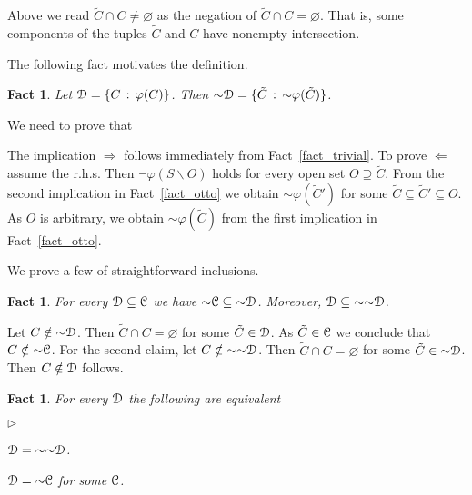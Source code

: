 \documentclass{amsproc}
\makeatletter
\newcommand{\mylabel}[1]{{#1}\hfill}
\renewenvironment{itemize}
  {\begin{list}{$\triangleright$}{%
  \setlength{\parskip}{0mm}
  \setlength{\topsep}{.1\baselineskip}
  \setlength{\rightmargin}{0mm}
  \setlength{\listparindent}{0mm}
  \setlength{\itemindent}{0mm}
  \setlength{\labelwidth}{3ex}
  \setlength{\itemsep}{.1\baselineskip}
  \setlength{\parsep}{.1\baselineskip}
  \setlength{\partopsep}{0mm}
  \setlength{\labelsep}{1ex}
  \setlength{\leftmargin}{\labelwidth+\labelsep}
  \let\makelabel\mylabel}}{%
\end{list}}
\newcounter{thm}
\theoremstyle{mio}
\newtheorem{fact}[thm]{Fact}\tcolorboxenvironment{fact}{mythm}
\providecommand{\proofNameStyle}{\bfseries}
\renewenvironment{proof}[1][\proofname]{\par
  \pushQED{\qed}%
  \normalfont%
  \trivlist
  \item[\hskip\labelsep
        \proofNameStyle
    #1\@addpunct{.}]\ignorespaces
}{%
  \popQED\endtrivlist\@endpefalse
}
\makeatother
\begin{document}
Above we read $\tilde C\cap C\neq\varnothing$ as the negation of $\tilde C\cap C=\varnothing$.
That is, some components of the tuples $\tilde C$ and $C$ have nonempty intersection.

The following fact motivates the definition.

\begin{fact}\label{fact_~definibile}
  Let ${\EuScript D}=\{C\,:\,\varphi(C)\}$.
  Then ${\sim}{\EuScript D}=\{\tilde C\,:\,{\sim}\varphi(\tilde C)\}$.
\end{fact}

\begin{proof}
  We need to prove that 


  The implication $\Rightarrow$ follows immediately from Fact~\ref{fact_trivial}.
  To prove $\Leftarrow$ assume the r.h.s.
  Then $\neg\varphi(S\smallsetminus O)$ holds for every open set  $O\supseteq\tilde C$.
  From the second implication in Fact~\ref{fact_otto} we obtain ${\sim}\varphi(\tilde C')$ for some $\tilde C\subseteq\tilde C'\subseteq O$.
As $O$ is arbitrary, we obtain ${\sim}\varphi(\tilde C)$ from the first implication in Fact~\ref{fact_otto}.
\end{proof}

We prove a few of straightforward inclusions.

\begin{fact}\label{fact_~inclusione}
  For every ${\EuScript D}\subseteq{\EuScript C}$ we have ${\sim}{\EuScript C}\subseteq{\sim}{\EuScript D}$.  
  Moreover, ${\EuScript D}\subseteq{\sim}{\sim}{\EuScript D}$.
\end{fact}

\begin{proof}
  Let $C\notin{\sim}{\EuScript D}$.
  Then $\tilde C\cap C=\varnothing$ for some $\tilde C\in{\EuScript D}$.
  As  $\tilde C\in{\EuScript C}$ we conclude that  $C\notin{\sim}{\EuScript C}$.
  For the second claim, let $C\notin{\sim}{\sim}{\EuScript D}$.
  Then $\tilde C\cap C=\varnothing$ for some $\tilde C\in{\sim}{\EuScript D}$.
  Then $C\notin{\EuScript D}$ follows.
\end{proof}

\begin{fact}
  For every ${\EuScript D}$ the following are equivalent
  \begin{itemize}
    \item [1.] ${\EuScript D}={\sim}{\sim}{\EuScript D}$.
    \item [2.] ${\EuScript D}={\sim}{\EuScript C}$ for some ${\EuScript C}$.
  \end{itemize}
\end{fact}
  
\end{document}
